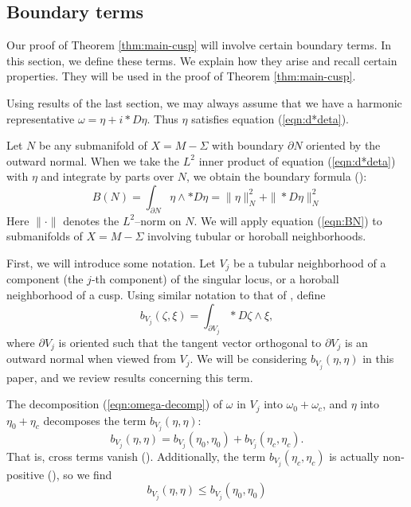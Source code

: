 

\subsection{Boundary terms}
\label{subsec:boundary-terms}

Our proof of Theorem \ref{thm:main-cusp} will involve certain boundary
terms.  In this section, we define these terms.  We explain how they
arise and recall certain properties.  They will be used in the
proof of Theorem \ref{thm:main-cusp}.



Using results of the last section, we may always assume that we have a
harmonic representative $\omega = \eta + i*D\eta$.  Thus $\eta$
satisfies equation (\ref{eqn:d*deta}).

Let $N$ be any submanifold of $X = M-\Sigma$ with boundary $\partial
N$ oriented by the outward normal.  When we take the $L^2$ inner
product of equation (\ref{eqn:d*deta}) with $\eta$ and integrate by
parts over $N$, we obtain the boundary formula (\cite[Lemma
2.3]{hk:univ}):
\begin{equation}
  B(N)= \int_{\partial N} \eta \wedge *D\eta = \| \eta \|^2_N + \|
  *D\eta \|^2_N 
  \label{eqn:BN}
\end{equation}
Here $\| \cdot \|$ denotes the $L^2$--norm on $N$.  We will apply
equation (\ref{eqn:BN}) to submanifolds of $X=M-\Sigma$ involving
tubular or horoball neighborhoods.

First, we will introduce some notation.  Let $V_j$ be a tubular
neighborhood of a component (the $j$-th component) of the singular
locus, or a horoball neighborhood of a cusp.  Using similar notation
to that of \cite{hk:univ}, define
$$b_{V_j}(\zeta,\xi)=\int_{\partial V_j}*D\zeta\wedge \xi,$$
where
$\partial V_j$ is oriented such that the tangent vector orthogonal to
$\partial V_j$ is an outward normal when viewed from $V_j$.  We will
be considering $b_{V_j}(\eta, \eta)$ in this paper, and we review
results concerning this term.

The decomposition (\ref{eqn:omega-decomp}) of $\omega$ in $V_j$ into
$\omega_0 + \omega_c$, and $\eta$ into $\eta_0 + \eta_c$ decomposes
the term $b_{V_j}(\eta, \eta)$:
\begin{equation}
b_{V_j}(\eta, \eta) = b_{V_j}(\eta_0, \eta_0) +
b_{V_j}(\eta_c, \eta_c).
\label{eqn:bV-decomp}
\end{equation}
That is, cross terms vanish (\cite[Lemma 2.5]{hk:univ}).
Additionally, the term $b_{V_j}(\eta_c, \eta_c)$ is actually
non-positive (\cite[Lemma 2.6]{hk:univ}), so we find
\begin{equation}
  b_{V_j}(\eta, \eta) \leq b_{V_j}(\eta_0, \eta_0)
\label{eqn:eta<eta_0}
\end{equation}



